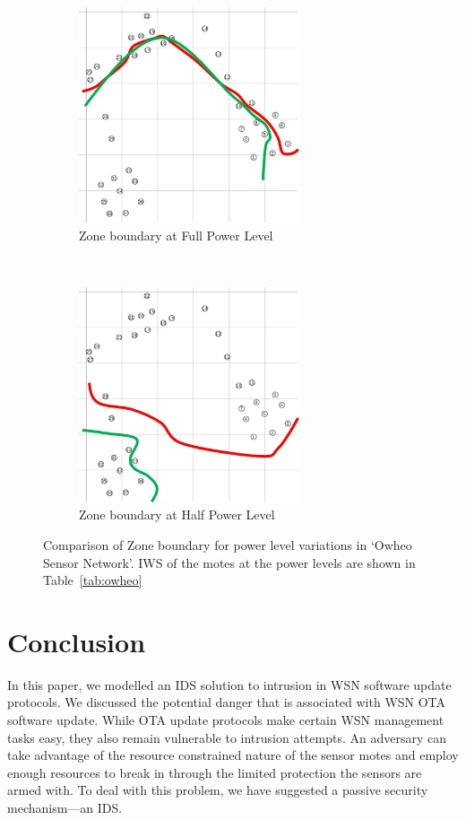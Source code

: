 \documentclass[conference]{IEEEtran}
\begin{document}
\begin{figure}[t!]
    \centering
    \begin{subfigure}[b]{0.5\textwidth}
        \centering
        \includegraphics[height=2.5in]{Owheo_full}
        \caption{Zone boundary at Full Power Level}
        \label{subfig:owheo_full}
    \end{subfigure}%
    ~ 
    \begin{subfigure}[b]{0.5\textwidth}
        \centering
        \includegraphics[height=2.5in]{Owheo_half}
        \caption{Zone boundary at Half Power Level}
        \label{subfig:owheo_half}
    \end{subfigure}
    \caption{Comparison of Zone boundary for power level variations in `Owheo Sensor Network'. IWS of the motes at the power levels are shown in Table~\ref{tab:owheo}}
\label{fig:owheo}
\end{figure}


\section{Conclusion}
\label{sec:concl}

In this paper, we modelled an IDS solution to intrusion in WSN software update protocols.
We discussed the potential danger that is associated with WSN OTA software update.
While OTA update protocols make certain WSN management tasks easy, they also remain vulnerable to intrusion attempts.
An adversary can take advantage of the resource constrained nature of the sensor motes and employ enough resources to break in through the limited protection the sensors are armed with.
To deal with this problem, we have suggested a passive security mechanism---an IDS.
\end{document}
